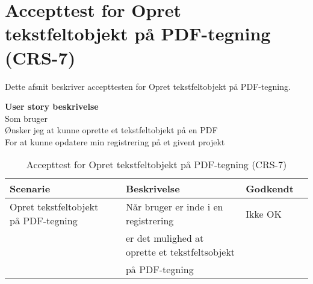 \section{Accepttest for Opret tekstfeltobjekt på PDF-tegning (CRS-7)}
Dette afsnit beskriver accepttesten for Opret tekstfeltobjekt på PDF-tegning.

\textbf{User story beskrivelse} \\
Som bruger \\
Ønsker jeg at kunne oprette et tekstfeltobjekt på en PDF \\
For at kunne opdatere min registrering på et givent projekt

\begin{table}[H]
	\centering
	\begin{tabular}{|ll|l|ll|} \hline
		\textbf{Scenarie} &  & \textbf{Beskrivelse}&  \textbf{Godkendt}&  \\ \hline
		Opret tekstfeltobjekt på PDF-tegning&  &  Når bruger er inde i en registrering &  Ikke OK&  \\
		& & er det mulighed at oprette et tekstfeltsobjekt& & \\ 
		& & på PDF-tegning& & \\ \hline
	\end{tabular}
	\caption{Accepttest for Opret tekstfeltobjekt på PDF-tegning (CRS-7)}
	\label{AcceptTekstfelt}
\end{table}